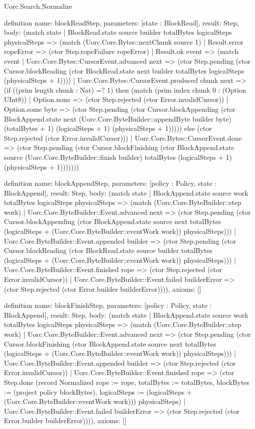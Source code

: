 \begin{lexlean}{Uorc.Search.Normalize}
\begin{semanticmodule}
definition{
  name: blockReadStep,
  parameters: [state : BlockRead],
  result: Step,
  body: (match state
    | BlockRead.state source builder totalBytes logicalSteps physicalSteps => (match (Uorc.Core.Bytes::nextChunk source 1)
      | Result.error ropeError => (ctor Step.ropeFailure ropeError)
      | Result.ok event => (match event
        | Uorc.Core.Bytes::CursorEvent.advanced next => (ctor Step.pending (ctor Cursor.blockReading (ctor BlockRead.state next builder totalBytes logicalSteps (physicalSteps + 1))))
        | Uorc.Core.Bytes::CursorEvent.produced chunk next => (if ((prim length chunk : Nat) =? 1) then (match (prim index chunk 0 : (Option UInt8))
          | Option.none => (ctor Step.rejected (ctor Error.invalidCursor))
          | Option.some byte => (ctor Step.pending (ctor Cursor.blockAppending (ctor BlockAppend.state next (Uorc.Core.ByteBuilder::appendByte builder byte) (totalBytes + 1) (logicalSteps + 1) (physicalSteps + 1))))) else (ctor Step.rejected (ctor Error.invalidCursor)))
        | Uorc.Core.Bytes::CursorEvent.done => (ctor Step.pending (ctor Cursor.blockFinishing (ctor BlockAppend.state source (Uorc.Core.ByteBuilder::finish builder) totalBytes (logicalSteps + 1) (physicalSteps + 1)))))))
}

definition{
  name: blockAppendStep,
  parameters: [policy : Policy, state : BlockAppend],
  result: Step,
  body: (match state
    | BlockAppend.state source work totalBytes logicalSteps physicalSteps => (match (Uorc.Core.ByteBuilder::step work)
      | Uorc.Core.ByteBuilder::Event.advanced next => (ctor Step.pending (ctor Cursor.blockAppending (ctor BlockAppend.state source next totalBytes (logicalSteps + (Uorc.Core.ByteBuilder::eventWork work)) physicalSteps)))
      | Uorc.Core.ByteBuilder::Event.appended builder => (ctor Step.pending (ctor Cursor.blockReading (ctor BlockRead.state source builder totalBytes (logicalSteps + (Uorc.Core.ByteBuilder::eventWork work)) physicalSteps)))
      | Uorc.Core.ByteBuilder::Event.finished rope => (ctor Step.rejected (ctor Error.invalidCursor))
      | Uorc.Core.ByteBuilder::Event.failed builderError => (ctor Step.rejected (ctor Error.builder builderError)))),
  axioms: []
}

definition{
  name: blockFinishStep,
  parameters: [policy : Policy, state : BlockAppend],
  result: Step,
  body: (match state
    | BlockAppend.state source work totalBytes logicalSteps physicalSteps => (match (Uorc.Core.ByteBuilder::step work)
      | Uorc.Core.ByteBuilder::Event.advanced next => (ctor Step.pending (ctor Cursor.blockFinishing (ctor BlockAppend.state source next totalBytes (logicalSteps + (Uorc.Core.ByteBuilder::eventWork work)) physicalSteps)))
      | Uorc.Core.ByteBuilder::Event.appended builder => (ctor Step.rejected (ctor Error.invalidCursor))
      | Uorc.Core.ByteBuilder::Event.finished rope => (ctor Step.done (record Normalized {rope := rope, totalBytes := totalBytes, blockBytes := (project policy blockBytes), logicalSteps := (logicalSteps + (Uorc.Core.ByteBuilder::eventWork work))}) physicalSteps)
      | Uorc.Core.ByteBuilder::Event.failed builderError => (ctor Step.rejected (ctor Error.builder builderError)))),
  axioms: []
}


\end{semanticmodule}
\end{lexlean}
